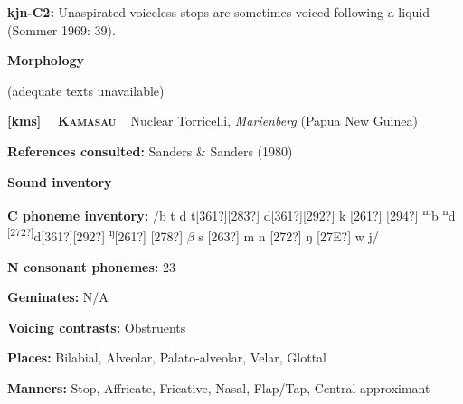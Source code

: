 \begin{styleBody}
\textbf{kjn-C2: }Unaspirated voiceless stops are sometimes voiced following a liquid (Sommer 1969: 39).
\end{styleBody}

\begin{styleBody}
\textbf{Morphology}
\end{styleBody}

\begin{styleBody}
(adequate texts unavailable)
\end{styleBody}

\clearpage\begin{styleBody}
\textbf{[kms] }\ \ \textbf{\textsc{Kamasau}}\textbf{\ \ }Nuclear Torricelli, \textit{Marienberg} (Papua New Guinea)
\end{styleBody}

\begin{styleBody}
\textbf{References consulted: }Sanders \& Sanders (1980)
\end{styleBody}

\begin{styleBody}
\textbf{Sound inventory}
\end{styleBody}

\begin{styleBody}
\textbf{C phoneme inventory:} /b t d t[361?][283?] d[361?][292?] k [261?] [294?] \textsuperscript{m}b \textsuperscript{n}d \textsuperscript{[272?]}d[361?][292?] \textsuperscript{ŋ}[261?] [278?] $\beta $ s [263?] m n [272?] ŋ [27E?] w j/
\end{styleBody}

\begin{styleBody}
\textbf{N consonant phonemes:} 23
\end{styleBody}

\begin{styleBody}
\textbf{Geminates:} N/A
\end{styleBody}

\begin{styleBody}
\textbf{Voicing contrasts:} Obstruents
\end{styleBody}

\begin{styleBody}
\textbf{Places:} Bilabial, Alveolar, Palato-alveolar, Velar, Glottal
\end{styleBody}

\begin{styleBody}
\textbf{Manners:} Stop, Affricate, Fricative, Nasal, Flap/Tap, Central approximant
\end{styleBody}

